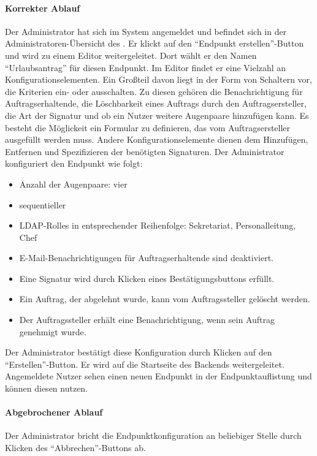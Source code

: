 \paragraph{Korrekter Ablauf}
Der Administrator hat sich im System angemeldet und befindet sich in der Administratoren-Übersicht des .
Er klickt auf den \enquote{Endpunkt erstellen}-Button und wird zu einem \gls{Editor} weitergeleitet.
Dort wählt er den Namen \enquote{Urlaubsantrag} für diesen Endpunkt.
Im Editor findet er eine Vielzahl an Konfigurationselementen. Ein Großteil davon liegt in der Form von Schaltern vor, die Kriterien ein- oder ausschalten. Zu diesen gehören die Benachrichtigung für Auftragserhaltende, die Löschbarkeit eines Auftrags durch den Auftragsersteller, die Art der \gls{Signatur} und ob ein Nutzer weitere Augenpaare hinzufügen kann.  Es besteht die Möglickeit ein \gls{Formular} zu definieren, das vom Auftragsersteller ausgefüllt werden muss. Andere Konfigurationselemente dienen dem Hinzufügen, Entfernen und Spezifizieren der benötigten Signaturen.
Der Administrator konfiguriert den Endpunkt wie folgt:
\begin{itemize}
	\item Anzahl der Augenpaare: vier
	\item sequentieller 
	\item \gls{LDAP}-\glspl{Rolle} in entsprechender Reihenfolge: Sekretariat, Personalleitung, Chef
	\item E-Mail-Benachrichtigungen für Auftragserhaltende sind deaktiviert.
	\item Eine Signatur wird durch Klicken eines Bestätigungsbuttons erfüllt.
	\item Ein Auftrag, der abgelehnt wurde, kann vom Auftragssteller gelöscht werden.
	\item Der Auftragssteller erhält eine Benachrichtigung, wenn sein Auftrag genehmigt wurde.
\end{itemize}
Der Administrator bestätigt diese Konfiguration durch Klicken auf den \enquote{Erstellen}-Button.
Er wird auf die Startseite des Backends weitergeleitet.
Angemeldete Nutzer sehen einen neuen Endpunkt in der Endpunktauflistung und können diesen nutzen.

\paragraph{Abgebrochener Ablauf}
Der Administrator bricht die Endpunktkonfiguration an beliebiger Stelle durch Klicken des \enquote{Abbrechen}-Buttons ab.

